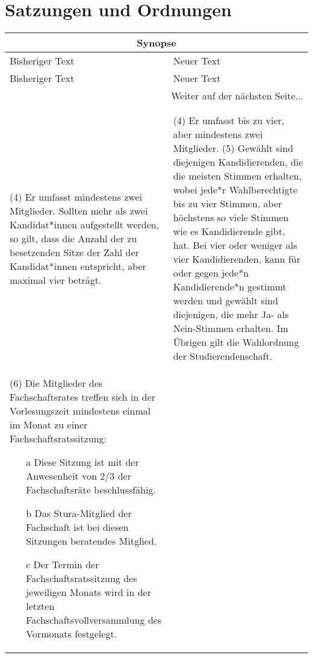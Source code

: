 \section{Satzungen und Ordnungen}

    {\begin{longtable}{|p{7.5cm}|p{7.5cm}|}
        \hline
        \multicolumn{2}{|c|}{Synopse}\\\hline
        Bisheriger Text & Neuer Text \\\hline
        \endfirsthead
        \hline
        Bisheriger Text & Neuer Text \\
        \hline
        \endhead
        \multicolumn{2}{|r|}{Weiter auf der nächsten Seite...}\\
        \endfoot
        \hline
        \multicolumn{2}{c}{Ende der Synopse} \\
        \endlastfoot
        \multicolumn{2}{|c|}{§3}\\\hline
        (4) Er umfasst mindestens zwei Mitglieder. Sollten mehr als zwei Kandidat*innen
        aufgestellt werden, so gilt, dass die Anzahl der zu besetzenden Sitze der Zahl der
        Kandidat*innen entspricht, aber maximal vier beträgt.
    &   (4) Er umfasst bis zu vier, aber mindestens zwei Mitglieder.\newline 
        (5) Gewählt sind diejenigen Kandidierenden, die die meisten Stimmen erhalten, wobei
        jede*r Wahlberechtigte bis zu vier Stimmen, aber höchstens so viele Stimmen wie es
        Kandidierende gibt, hat. Bei vier oder weniger als vier Kandidierenden, kann für oder
        gegen jede*n Kandidierende*n gestimmt werden und gewählt sind diejenigen, die mehr
        Ja- als Nein-Stimmen erhalten. Im Übrigen gilt die Wahlordnung der
        Studierendenschaft.\\\hline
        (6) Die Mitglieder des Fachschaftsrates treffen sich in der Vorlesungszeit mindestens
        einmal im Monat zu einer Fachschaftsratssitzung:
        \begin{enumerate}
            \item[a] Diese Sitzung ist mit der Anwesenheit von 2/3 der Fachschaftsräte beschlussfähig.
            \item[b] Das Stura-Mitglied der Fachschaft ist bei diesen Sitzungen beratendes Mitglied.
            \item[c] Der Termin der Fachschaftsratssitzung des jeweiligen Monats wird in der letzten
            Fachschaftsvollversammlung des Vormonats festgelegt.

\end{enumerate}
\end{longtable}}
